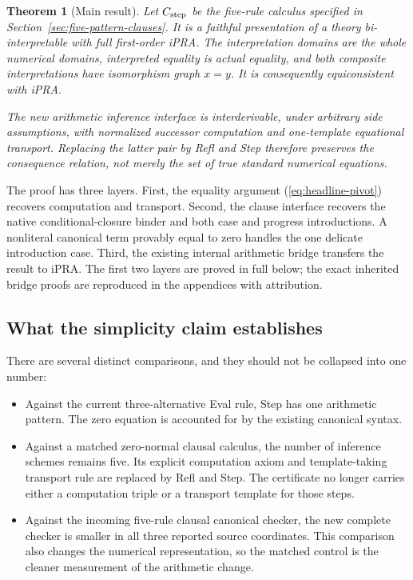 \documentclass[11pt,letterpaper]{article}
\newtheorem{theorem}{Theorem}[section]
\theoremstyle{definition}
\begin{document}
\begin{theorem}[Main result]\label{thm:main}
Let \(C_{\rm step}\) be the five-rule calculus specified in
Section~\ref{sec:five-pattern-clauses}. It is a faithful presentation of
a theory bi-interpretable with full first-order iPRA.
The interpretation domains are the whole numerical domains, interpreted
equality is actual equality, and both composite interpretations have
isomorphism graph \(x=y\). It is consequently equiconsistent with iPRA.

The new arithmetic inference interface is interderivable, under arbitrary
side assumptions, with normalized successor computation and
one-template equational transport. Replacing the latter pair by Refl
and Step therefore preserves the consequence relation, not merely the
set of true standard numerical equations.
\end{theorem}

The proof has three layers. First, the equality argument
(\ref{eq:headline-pivot}) recovers computation and transport.
Second, the clause interface recovers the native conditional-closure
binder and both case and progress introductions. A nonliteral canonical
term provably equal to zero handles the one delicate introduction case.
Third, the existing internal arithmetic bridge transfers the result to
iPRA. The first two layers are proved in full below; the exact inherited
bridge proofs are reproduced in the appendices with attribution.

\subsection{What the simplicity claim establishes}

There are several distinct comparisons, and they should not be
collapsed into one number:
\begin{itemize}
\item Against the current three-alternative Eval rule, Step has one
  arithmetic pattern. The zero equation is accounted for by the
  existing canonical syntax.
\item Against a matched zero-normal clausal calculus, the number of
  inference schemes remains five. Its explicit computation axiom and
  template-taking transport rule are replaced by Refl and Step.
  The certificate no longer carries either a computation triple or a
  transport template for those steps.
\item Against the incoming five-rule clausal canonical checker, the new
  complete checker is smaller in all three reported source coordinates.
  This comparison also changes the numerical representation, so the
  matched control is the cleaner measurement of the arithmetic change.
\end{itemize}
\end{document}
